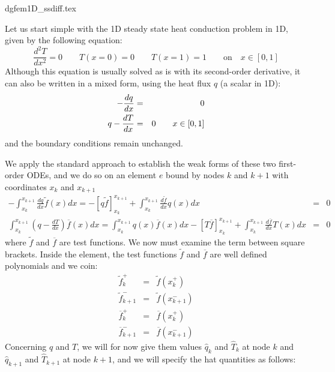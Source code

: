 \begin{flushright} {\tiny {\color{gray} dgfem1D\_ssdiff.tex}} \end{flushright}

Let us start simple with the 1D steady state heat conduction problem in 1D, given by the following 
equation:
\begin{equation}
\frac{d^2T}{dx^2}=0 \qquad T(x=0)=0 \qquad T(x=1)=1 \qquad \text{on} \quad x\in[0,1]
\end{equation}
Although this equation is usually solved as is with its second-order derivative, it can also 
be written in a mixed form, using the heat flux $q$ (a scalar in 1D):
\begin{eqnarray}
-\frac{dq}{dx} &=&0   \nonumber\\
q-\frac{dT}{dx}&=&0 \qquad x\in[0,1]
\end{eqnarray}
and the boundary conditions remain unchanged. 

We apply the standard approach to establish the weak forms of these two first-order ODEs, and we do so 
on an element $e$ bound by nodes $k$ and $k+1$ with coordinates $x_k$ and $x_{k+1}$
\begin{eqnarray}
-\int_{x_k}^{x_{k+1}} \frac{dq}{dx} \tilde{f}(x) dx = -\left[q \tilde{f} \right]_{x_k}^{x_{k+1}} 
+ \int_{x_k}^{x_{k+1}} \frac{d\tilde{f}}{dx} q(x) dx &=& 0
\label{eq:dg1}\\
\int_{x_k}^{x_{k+1}}  \left( q-\frac{dT}{dx} \right) \overline{f}(x) dx
=
\int_{x_k}^{x_{k+1}}  q(x) \overline{f}(x) dx
-\left[ T \overline{f}  \right]_{x_k}^{x_{k+1}} + \int_{x_k}^{x_{k+1}} \frac{d\overline{f}}{dx} T(x) dx 
&=& 0
\label{eq:dg2}
\end{eqnarray}
where $\tilde{f}$ and $\overline{f}$ are test functions.
We now must examine the term between square brackets. 
Inside the element, the test functions $\tilde{f}$ and $\overline{f}$ are well defined polynomials
and we coin:
\begin{eqnarray}
\tilde{f}_k^+&=&\tilde{f}(x_k^+)\\
\tilde{f}_{k+1}^-&=&\tilde{f}(x_{k+1}^-)\\
\overline{f}_k^+&=&\overline{f}(x_k^+)\\
\overline{f}_{k+1}^-&=&\overline{f}(x_{k+1}^-)
\end{eqnarray}
Concerning $q$ and $T$, we will for now  give them values $\hat{q}_k$ and $\hat{T}_k$ at node $k$
and $\hat{q}_{k+1}$ and $\hat{T}_{k+1}$ at node $k+1$, and we will specify the hat quantities as follows:

